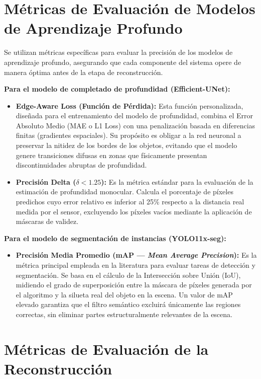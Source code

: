 \documentclass[12pt, a4, twoside, openany]{report}
\begin{document}
\section{Métricas de Evaluación de Modelos de Aprendizaje Profundo}

Se utilizan métricas específicas para evaluar la precisión de los modelos de aprendizaje profundo, asegurando que cada componente del sistema opere de manera óptima antes de la etapa de reconstrucción.

\textbf{Para el modelo de completado de profundidad (Efficient-UNet):}
\begin{itemize}
    \item \textbf{Edge-Aware Loss (Función de Pérdida):} Esta función personalizada, diseñada para el entrenamiento del modelo de profundidad, combina el Error Absoluto Medio (MAE o L1 Loss) con una penalización basada en diferencias finitas (gradientes espaciales). Su propósito es obligar a la red neuronal a preservar la nitidez de los bordes de los objetos, evitando que el modelo genere transiciones difusas en zonas que físicamente presentan discontinuidades abruptas de profundidad.
    \item \textbf{Precisión Delta ($\delta < 1.25$):} Es la métrica estándar para la evaluación de la estimación de profundidad monocular. Calcula el porcentaje de píxeles predichos cuyo error relativo es inferior al 25\% respecto a la distancia real medida por el sensor, excluyendo los píxeles vacíos mediante la aplicación de máscaras de validez.
\end{itemize}


\textbf{Para el modelo de segmentación de instancias (YOLO11x-seg):}
\begin{itemize}
    \item \textbf{Precisión Media Promedio (mAP --- \textit{Mean Average Precision}):} Es la métrica principal empleada en la literatura para evaluar tareas de detección y segmentación. Se basa en el cálculo de la Intersección sobre Unión (IoU), midiendo el grado de superposición entre la máscara de píxeles generada por el algoritmo y la silueta real del objeto en la escena. Un valor de mAP elevado garantiza que el filtro semántico excluirá únicamente las regiones correctas, sin eliminar partes estructuralmente relevantes de la escena.
\end{itemize}

\section{Métricas de Evaluación de la Reconstrucción}
\end{document}
